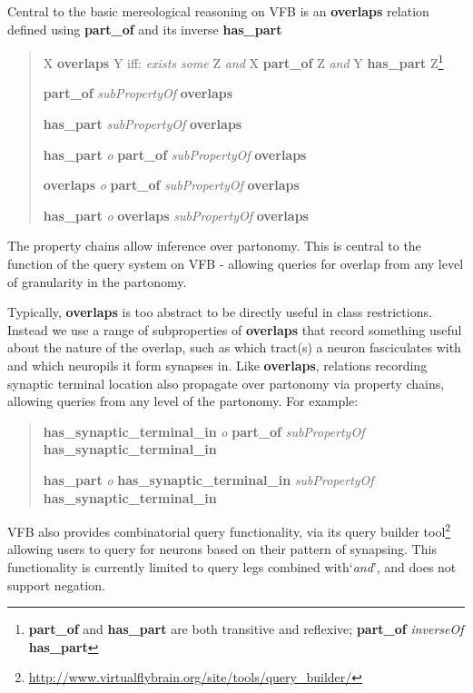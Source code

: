 \documentclass[runningheads,a4paper]{llncs}
\begin{document}
Central to the basic mereological reasoning on VFB is an
\textbf{overlaps} relation defined using \textbf{part\_of} and its
inverse \textbf{has\_part}

\begin{quote}
X \textbf{overlaps} Y iff: \textit{exists some} Z \textit{and}
X \textbf{part\_of} Z \textit{and} Y \textbf{has\_part}
Z\footnote{\textbf{part\_of} and \textbf{has\_part} are both
  transitive and reflexive; \textbf{part\_of} \textit{inverseOf}
  \textbf{has\_part}}

\textbf{part\_of} \textit{subPropertyOf}
  \textbf{overlaps}

\textbf{has\_part} \textit{subPropertyOf} \textbf{overlaps}

\textbf{has\_part} \textit{o} \textbf{part\_of} \textit{subPropertyOf}
\textbf{overlaps}

\textbf{overlaps} \textit{o} \textbf{part\_of} \textit{subPropertyOf} \textbf{overlaps}

\textbf{has\_part} \textit{o} \textbf{overlaps} \textit{subPropertyOf}
\textbf{overlaps}\end{quote}

The property chains allow inference over partonomy.  This is central
to the function of the query system on VFB - allowing queries for
overlap from any level of granularity in the partonomy.

Typically, \textbf{overlaps} is too abstract to be directly useful in
class restrictions. Instead we use a range of subproperties of
\textbf{overlaps} that record something useful about the nature of the
overlap, such as which tract(s) a neuron fasciculates with and which
neuropils it form synapses in.  Like \textbf{overlaps}, relations
recording synaptic terminal location also propagate over partonomy via
property chains, allowing queries from any level of the partonomy.
For example:

\begin{quote}
\textbf{has\_synaptic\_terminal\_in} \textit{o} \textbf{part\_of} \textit{subPropertyOf}
\textbf{has\_synaptic\_terminal\_in}

\textbf{has\_part} \textit{o} \textbf{has\_synaptic\_terminal\_in} \textit{subPropertyOf}
\textbf{has\_synaptic\_terminal\_in}
\end{quote}

VFB also provides combinatorial query functionality, via its
query builder tool\footnote{\url{http://www.virtualflybrain.org/site/tools/query_builder/}}
allowing users to query for neurons based on their pattern of
synapsing.  This functionality is currently limited to query legs
combined with`\textit {and}', and does not support negation.
\end{document}
